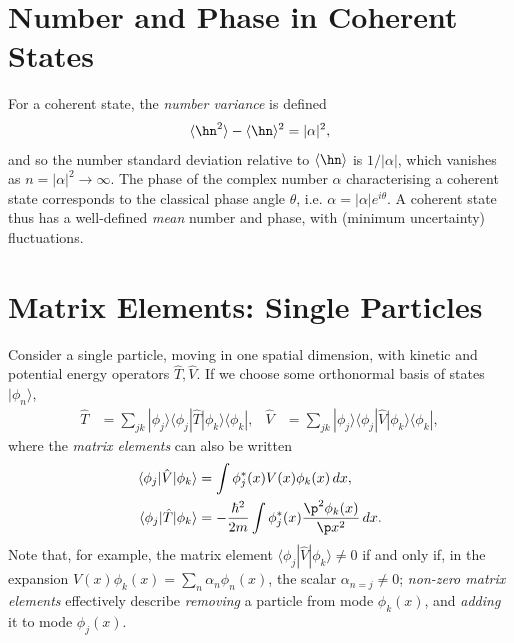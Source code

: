 \documentclass[qo.tex]{subfiles}
\begin{document}
\section{Number and Phase in Coherent States}
For a coherent state, the \emph{number variance} is defined 
\begin{align}
    \langle\hn^2\rangle-\langle\hn\rangle^2 = |\alpha|^2,
\end{align}
and so the number standard deviation relative to $\langle\hn\rangle$ is $1/|\alpha|$, which vanishes as $n=|\alpha|^2\to\infty$.
The phase of the complex number $\alpha$ characterising a coherent state corresponds to the classical phase angle $\theta$, i.e. $\alpha=|\alpha|e^{i\theta}$.
A coherent state thus has a well-defined \emph{mean} number and phase, with (minimum uncertainty) fluctuations.

\section{Matrix Elements: Single Particles}
Consider a single particle, moving in one spatial dimension, with kinetic and potential energy operators $\hat{T},\hat{V}$. 
If we choose some orthonormal basis of states $|\phi_n\rangle$,
\begin{align}
    \hat{T} &= \sum_{jk} |\phi_j\rangle\langle\phi_j|\hat{T}|\phi_k\rangle\langle\phi_k|, & \hat{V} &= \sum_{jk} |\phi_j\rangle\langle\phi_j|\hat{V}|\phi_k\rangle\langle\phi_k|,
\end{align}
where the \emph{matrix elements} can also be written 
\begin{align}
    \langle\phi_j|\hat{V}|\phi_k\rangle &= \int \phi_j^*(x)V(x)\phi_k(x)\,dx, \\
    \langle\phi_j|\hat{T}|\phi_k\rangle &= -\frac{\hbar^2}{2m}\int \phi_j^*(x)\frac{\p^2\phi_k(x)}{\p x^2}\,dx.
\end{align}
Note that, for example, the matrix element $\langle\phi_j|\hat{V}|\phi_k\rangle\neq0$ if and only if, in the expansion $V(x)\phi_k(x)=\sum_n\alpha_n\phi_n(x)$, the scalar $\alpha_{n=j}\neq0$; \emph{non-zero matrix elements} effectively describe \emph{removing} a particle from mode $\phi_k(x)$, and \emph{adding} it to mode $\phi_j(x)$.
\end{document}
